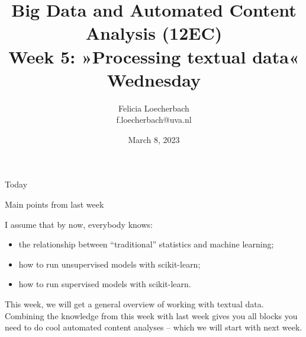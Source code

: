 

\graphicspath{{../../resources/img/}}




\title[Big Data and Automated Content Analysis]{\textbf{Big Data and Automated Content Analysis (12EC)} 
\\Week 5: »Processing textual data«
\\Wednesday}
\author[Felicia Loecherbach]{Felicia Loecherbach\\ \footnotesize{f.loecherbach@uva.nl\\}}
\date{March 8, 2023}


\begin{frame}{}
	\titlepage
\end{frame}

\begin{frame}{Today}
	\tableofcontents
\end{frame}





\begin{frame}{Main points from last week}

\begin{alertblock}{I assume that by now, everybody knows:}
\begin{itemize}
\item the relationship between ``traditional'' statistics and machine learning;
\item how to run unsupervised models with scikit-learn;
\item how to run supervised models with scikit-learn.
\end{itemize}
\end{alertblock}
\end{frame}


\begin{frame}[standout]
This week, we will get a general overview of working with textual data. Combining the knowledge from this week with last week gives you all blocks you need to do cool automated content analyses -- which we will start with next week.
\end{frame}


















